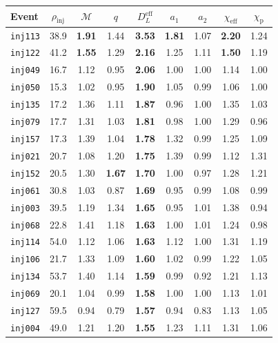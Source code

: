 \begin{table}[h!]
\centering
\renewcommand{\arraystretch}{1.2}
{\newcommand{\hi}[1]{\textcolor[HTML]{ED935C}{\textbf{#1}}}%
\begin{tabular}{lcccccccc}
\hline\hline
Event & $\rho_\mathrm{inj}$ & $\mathcal{M}$ & $q$ & $D_L^{\mathrm{eff}}$ & $a_1$ & $a_2$ & $\chi_\mathrm{eff}$ & $\chi_\mathrm{p}$ \\
\hline
\texttt{inj113} & 38.9 & \hi{1.91} & 1.44 & \hi{3.53} & \hi{1.81} & 1.07 & \hi{2.20} & 1.24 \\
\texttt{inj122} & 41.2 & \hi{1.55} & 1.29 & \hi{2.16} & 1.25 & 1.11 & \hi{1.50} & 1.19 \\
\texttt{inj049} & 16.7 & 1.12 & 0.95 & \hi{2.06} & 1.00 & 1.00 & 1.14 & 1.00 \\
\texttt{inj050} & 15.3 & 1.02 & 0.95 & \hi{1.90} & 1.05 & 0.99 & 1.06 & 1.00 \\
\texttt{inj135} & 17.2 & 1.36 & 1.11 & \hi{1.87} & 0.96 & 1.00 & 1.35 & 1.03 \\
\texttt{inj079} & 17.7 & 1.31 & 1.03 & \hi{1.81} & 0.98 & 1.00 & 1.29 & 0.96 \\
\texttt{inj157} & 17.3 & 1.39 & 1.04 & \hi{1.78} & 1.32 & 0.99 & 1.25 & 1.09 \\
\texttt{inj021} & 20.7 & 1.08 & 1.20 & \hi{1.75} & 1.39 & 0.99 & 1.12 & 1.31 \\
\texttt{inj152} & 20.5 & 1.30 & \hi{1.67} & \hi{1.70} & 1.00 & 0.97 & 1.28 & 1.21 \\
\texttt{inj061} & 30.8 & 1.03 & 0.87 & \hi{1.69} & 0.95 & 0.99 & 1.08 & 0.99 \\
\texttt{inj003} & 39.5 & 1.19 & 1.34 & \hi{1.65} & 0.95 & 1.01 & 1.38 & 0.94 \\
\texttt{inj068} & 22.8 & 1.41 & 1.18 & \hi{1.63} & 1.00 & 1.01 & 1.24 & 0.98 \\
\texttt{inj114} & 54.0 & 1.12 & 1.06 & \hi{1.63} & 1.12 & 1.00 & 1.31 & 1.19 \\
\texttt{inj106} & 21.7 & 1.33 & 1.09 & \hi{1.60} & 1.02 & 0.99 & 1.22 & 1.05 \\
\texttt{inj134} & 53.7 & 1.40 & 1.14 & \hi{1.59} & 0.99 & 0.92 & 1.21 & 1.13 \\
\texttt{inj069} & 20.1 & 1.04 & 0.99 & \hi{1.58} & 1.00 & 1.00 & 1.13 & 1.01 \\
\texttt{inj127} & 59.5 & 0.94 & 0.79 & \hi{1.57} & 0.94 & 0.83 & 1.13 & 1.05 \\
\texttt{inj004} & 49.0 & 1.21 & 1.20 & \hi{1.55} & 1.23 & 1.11 & 1.31 & 1.06 \\

\end{tabular}}
\end{table}
